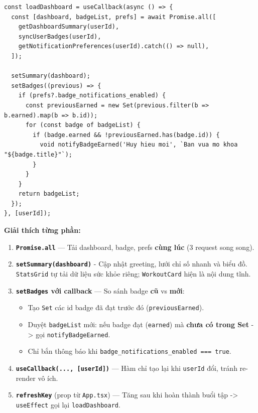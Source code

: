 \documentclass[12pt,a4paper]{article}
\providecommand{\tightlist}{%
  \setlength{\itemsep}{0pt}\setlength{\parskip}{0pt}}
\begin{document}
\begin{verbatim}
const loadDashboard = useCallback(async () => {
  const [dashboard, badgeList, prefs] = await Promise.all([
    getDashboardSummary(userId),
    syncUserBadges(userId),
    getNotificationPreferences(userId).catch(() => null),
  ]);

  setSummary(dashboard);
  setBadges((previous) => {
    if (prefs?.badge_notifications_enabled) {
      const previousEarned = new Set(previous.filter(b => b.earned).map(b => b.id));
      for (const badge of badgeList) {
        if (badge.earned && !previousEarned.has(badge.id)) {
          void notifyBadgeEarned('Huy hieu moi', `Ban vua mo khoa "${badge.title}"`);
        }
      }
    }
    return badgeList;
  });
}, [userId]);

\end{verbatim}

\textbf{Giải thích từng phần:}

\begin{enumerate}
\def\labelenumi{\arabic{enumi}.}
\tightlist
\item
  \textbf{\texttt{Promise.all}} --- Tải dashboard, badge, prefs
  \textbf{cùng lúc} (3 request song song).
\item
  \textbf{\texttt{setSummary(dashboard)}} - Cập nhật greeting, lưới chỉ
  số nhanh và biểu đồ. \texttt{StatsGrid} tự tải dữ liệu sức khỏe riêng;
  \texttt{WorkoutCard} hiện là nội dung tĩnh.
\item
  \textbf{\texttt{setBadges} với callback} --- So sánh badge \textbf{cũ}
  vs \textbf{mới}:

  \begin{itemize}
  \tightlist
  \item
    Tạo \texttt{Set} các id badge đã đạt trước đó
    (\texttt{previousEarned}).
  \item
    Duyệt \texttt{badgeList} mới: nếu badge đạt (\texttt{earned}) mà
    \textbf{chưa có trong Set} -\textgreater{} gọi
    \texttt{notifyBadgeEarned}.
  \item
    Chỉ bắn thông báo khi
    \texttt{badge\_notifications\_enabled\ ===\ true}.
  \end{itemize}
\item
  \textbf{\texttt{useCallback(...,\ {[}userId{]})}} --- Hàm chỉ tạo lại
  khi \texttt{userId} đổi, tránh re-render vô ích.
\item
  \textbf{\texttt{refreshKey}} (prop từ \texttt{App.tsx}) --- Tăng sau
  khi hoàn thành buổi tập -\textgreater{} \texttt{useEffect} gọi lại
  \texttt{loadDashboard}.
\end{enumerate}
\end{document}
